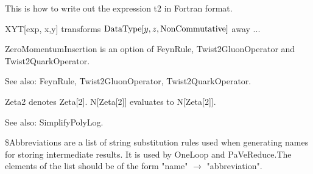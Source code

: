 




This is how to write out the expression t2 in Fortran format.







XYT[exp, x,y] transforms { }\(\mathrm{DataType}[y,z,\mathrm{NonCommutative}]\) away ...



ZeroMomentumInsertion is an option of FeynRule, Twist2GluonOperator and Twist2QuarkOperator.

See also: { }FeynRule, Twist2GluonOperator, Twist2QuarkOperator.



Zeta2 denotes Zeta[2]. N[Zeta[2]] evaluates to N[Zeta[2]].

See also: SimplifyPolyLog.



\dispSFoutmath{
\{ \} 
}







\${}Abbreviations are a list of string substitution rules used when generating names for storing intermediate results. It is used by
  OneLoop and PaVeReduce.The elements of the list should be of the form "name" \(\rightarrow \) "abbreviation".

